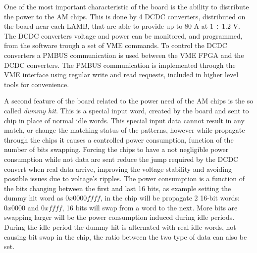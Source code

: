 One of the most important characteristic of the board is the ability to distribute
the power to the AM chips. This is done by 4 DCDC converters, distributed on the
board near each LAMB, that are able to provide up to 80 A at $1\div1.2$ V. The
DCDC converters voltage and power can be monitored, and programmed, from the software
trough a set of VME commands.
To control the DCDC converters a PMBUS communication is used between the VME
FPGA and the DCDC converters. The PMBUS communication is implemented through the
VME interface using regular write and read requests, included in higher
level tools for convenience.

A second feature of the board related to the power need of the AM chips is
the so called \emph{dummy hit}. This is a special input word, created by the board
and sent to chip in place of normal idle words. This special input data cannot 
result in any match, or change the matching status of the patterns, however while
propagate through the chips it causes a controlled power consumption, function of
the number of bits swapping. Forcing the chips to have a not negligible power
consumption while not data are sent reduce the jump required by the DCDC convert
when real data arrive, improving the voltage stability and avoiding possible
issues due to voltage's ripples. The power consumption is a function of the 
bits changing between the first and last 16 bits, as example setting the dummy 
hit word as $0x0000ffff$, in the chip will be propagate 2 16-bit words: $0x0000$
and $0xffff$, 16 bits will swap from a word to the next. 
More bits are swapping larger will be the  power consumption induced during idle
periods. During the idle period the dummy hit is alternated with real idle words,
not causing bit swap in the chip, the ratio between the two type of data can also be
set.